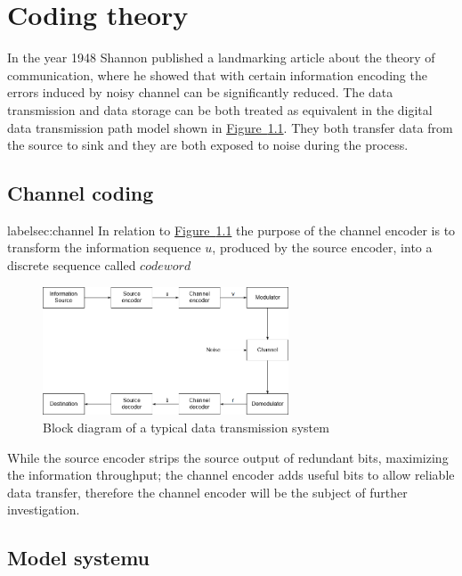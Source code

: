 \documentclass[]{myclass}
\begin{document}
\chapter{Coding theory} \label{ch:coding}
In the year 1948 Shannon published a landmarking article about the theory of communication, \cite{article:shannon} where he showed that with certain information encoding the errors induced by noisy channel can be significantly reduced. The data transmission and data storage can be both treated as equivalent in the digital data transmission path model shown in \hyperref[fig:data_path]{Figure~\ref*{fig:data_path}}. They both transfer data from the source to sink and they are both exposed to noise during the process.\\

\section{Channel coding} label{sec:channel}
In relation to \hyperref[fig:data_path]{Figure~\ref*{fig:data_path}} the purpose of the channel encoder is to transform the information sequence $u$, produced by the source encoder, into a discrete sequence called $code word$

\begin  {figure}  [h]
\centering
\includegraphics[width=0.65\textwidth]{figures/Data_transmission_path.png}
\caption{Block diagram of a typical data transmission system \cite{book:1983}}
\label{fig:data_path}
\end {figure}

While the source encoder strips the source output of redundant bits, maximizing the information throughput; the channel encoder adds useful bits to allow reliable data transfer, therefore the channel encoder will be the subject of further investigation. 

\section{Model systemu} \label{sec:model}
\end{document}
